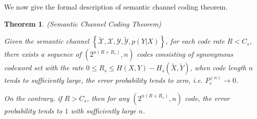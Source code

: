 \documentclass[12pt, draftclsnofoot,onecolumn]{IEEEtran}
\newtheorem{theorem}{\bf{Theorem}}
\begin{document}
We now give the formal description of semantic channel coding theorem.
\begin{theorem}\label{Sem_CCT}
(Semantic Channel Coding Theorem)

Given the semantic channel $\left\{\tilde{\mathcal{X}},\mathcal{X},\mathcal{Y},\tilde{\mathcal{Y}}, p(Y|X)\right\}$, for each code rate $R<C_s$, there exists a sequence of $\left(2^{n(R+R_s)},n\right)$ codes consisting of synonymous codeword set with the rate $0\leq R_s \leq H(X,Y)-H_s(\tilde{X},\tilde{Y})$, when code length $n$ tends to sufficiently large, the error probability tends to zero, i.e. $P_e^{(n)}\to 0$.

On the contrary, if $R>C_s$, then for any $\left(2^{n{(R+R_s)}},n\right)$ code, the error probability tends to $1$ with sufficiently large $n$.
\end{theorem}
\end{document}
